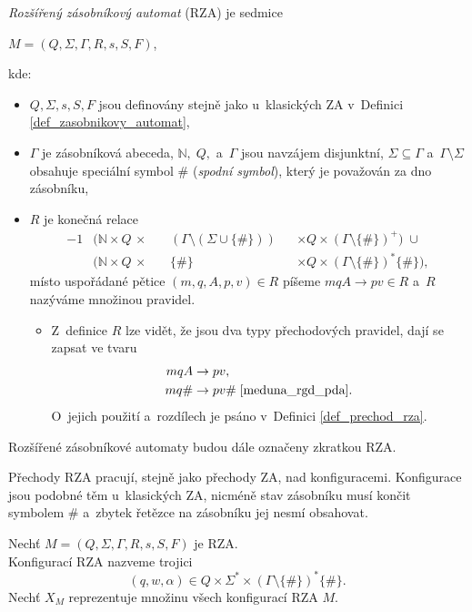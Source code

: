 \begin{definition}\label{def_rza}
    \emph{Rozšířený zásobníkový automat} (RZA) je sedmice
    \begin{center}
        $M = (Q, \Sigma, \Gamma, R, s, S, F)$,
    \end{center}
    kde:
    \begin{itemize}
        \item $Q, \Sigma, s, S, F$ jsou definovány stejně jako u~klasických ZA v~Definici \ref{def_zasobnikovy_automat},
        \item $\Gamma$ je zásobníková abeceda, $\mathbb{N},\; Q,$ a~$\Gamma$ jsou navzájem disjunktní, $\Sigma \subseteq \Gamma$ a~$\Gamma \setminus \Sigma$ obsahuje speciální symbol $\#$ (\emph{spodní symbol}), který je považován za dno zásobníku, 
        \item $R$ je konečná relace
        \begin{alignat*}{-1}
             &(\mathbb{N} \times Q \,\times \,&& (\Gamma \setminus (\Sigma \cup \{\#\})) &&\times Q \times (\Gamma \setminus \{\#\})^+) \;\cup \\
             &(\mathbb{N} \times Q \,\times \,&& \{\#\} &&\times Q \times (\Gamma \setminus \{\#\})^*\{\#\}),
        \end{alignat*}
        místo uspořádané pětice $(m, q, A, p, v) \in R$ píšeme $mqA \rightarrow pv \in R$ a~$R$ nazýváme množinou pravidel.
        \begin{itemize}[label=$\circ$]
            \item Z~definice $R$ lze vidět, že jsou dva typy přechodových pravidel, dají se zapsat ve tvaru
            \begin{align*}
                mqA  &\rightarrow pv,\\
                mq\# &\rightarrow pv\# \; \cite{meduna_rgd_pda}.
            \end{align*}
            O~jejich použití a~rozdílech je psáno v~Definici \ref{def_prechod_rza}.
        \end{itemize}
    \end{itemize}
\end{definition}

\begin{convention}
    Rozšířené zásobníkové automaty budou dále označeny zkratkou RZA.
\end{convention}

Přechody RZA pracují, stejně jako přechody ZA, nad konfiguracemi.
Konfigurace jsou podobné těm u~klasických ZA, nicméně stav zásobníku musí končit symbolem $\#$ a~zbytek řetězce na zásobníku jej nesmí obsahovat. 
\begin{definition}\label{def_konfigurace_rza}
    Nechť $M = (Q, \Sigma, \Gamma, R, s, S, F)$ je RZA.\\
    Konfigurací RZA nazveme trojici
    \begin{equation*}
        (q, w, \alpha) \in Q \times \Sigma^* \times (\Gamma \setminus \{\#\})^*\{\#\}.
    \end{equation*}
    Nechť $X_M$ reprezentuje množinu všech konfigurací RZA $M$.
\end{definition}

